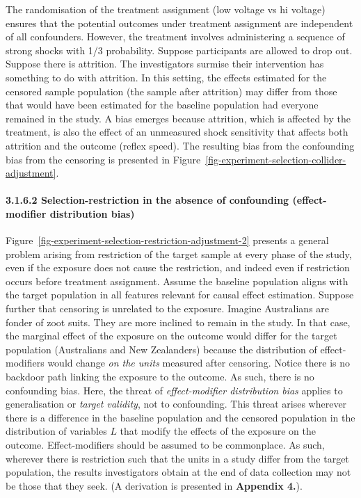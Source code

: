 \documentclass[
  singlecolumn]{article}
\let\oldparagraph\paragraph
\renewcommand{\paragraph}[1]{\oldparagraph{#1}\mbox{}}
\begin{document}
The randomisation of the treatment assignment (low voltage vs hi
voltage) ensures that the potential outcomes under treatment assignment
are independent of all confounders. However, the treatment involves
administering a sequence of strong shocks with 1/3 probability. Suppose
participants are allowed to drop out. Suppose there is attrition. The
investigators surmise their intervention has something to do with
attrition. In this setting, the effects estimated for the censored
sample population (the sample after attrition) may differ from those
that would have been estimated for the baseline population had everyone
remained in the study. A bias emerges because attrition, which is
affected by the treatment, is also the effect of an unmeasured shock
sensitivity that affects both attrition and the outcome (reflex speed).
The resulting bias from the confounding bias from the censoring is
presented in Figure~\ref{fig-experiment-selection-collider-adjustment}.

\paragraph{3.1.6.2 Selection-restriction in the absence of confounding
(effect-modifier distribution
bias)}\label{selection-restriction-in-the-absence-of-confounding-effect-modifier-distribution-bias}

Figure~\ref{fig-experiment-selection-restriction-adjustment-2} presents
a general problem arising from restriction of the target sample at every
phase of the study, even if the exposure does not cause the restriction,
and indeed even if restriction occurs before treatment assignment.
Assume the baseline population aligns with the target population in all
features relevant for causal effect estimation. Suppose further that
censoring is unrelated to the exposure. Imagine Australians are fonder
of zoot suits. They are more inclined to remain in the study. In that
case, the marginal effect of the exposure on the outcome would differ
for the target population (Australians and New Zealanders) because the
distribution of effect-modifiers would change \emph{on the units}
measured after censoring. Notice there is no backdoor path linking the
exposure to the outcome. As such, there is no confounding bias. Here,
the threat of \emph{effect-modifier distribution bias} applies to
generalisation or \emph{target validity}, not to confounding. This
threat arises wherever there is a difference in the baseline population
and the censored population in the distribution of variables \(L\) that
modify the effects of the exposure on the outcome. Effect-modifiers
should be assumed to be commonplace. As such, wherever there is
restriction such that the units in a study differ from the target
population, the results investigators obtain at the end of data
collection may not be those that they seek. (A derivation is presented
in \textbf{Appendix 4.}).
\end{document}
